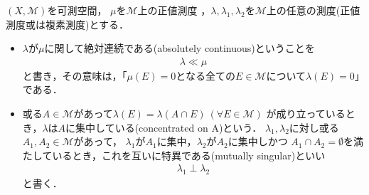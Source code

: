 	
	\begin{itembox}[l]{}
		\begin{dfn}[絶対連続・特異]
			$(X,\mathcal{M})$を可測空間，
			$\mu$を$\mathcal{M}$上の正値測度\footnotemark
			，$\lambda,\lambda_1,\lambda_2$を$\mathcal{M}$上の任意の測度({\scriptsize 正値測度或は複素測度})とする．
			\begin{itemize}
				\item $\lambda$が$\mu$に関して絶対連続である(absolutely continuous)ということを
					\begin{align}
						\lambda \ll \mu
					\end{align}
					と書き，その意味は，「$\mu(E)=0$となる全ての$E \in \mathcal{M}$について$\lambda(E)=0$」である．
				
				\item 或る$A \in \mathcal{M}$があって$\lambda(E) = \lambda(A \cap E)\ (\forall E \in \mathcal{M})$
					が成り立っているとき，$\lambda$は$A$に集中している(concentrated on A)という．
					$\lambda_1,\lambda_2$に対し或る$A_1,A_2 \in \mathcal{M}$があって，
					$\lambda_1$が$A_1$に集中，$\lambda_2$が$A_2$に集中しかつ
					$A_1 \cap A_2 = \emptyset$を満たしているとき，これを互いに特異である(mutually singular)といい
					\begin{align}
						\lambda_1 \perp \lambda_2
					\end{align}
					と書く．
			\end{itemize}
		\end{dfn}
	\end{itembox}
	
	
